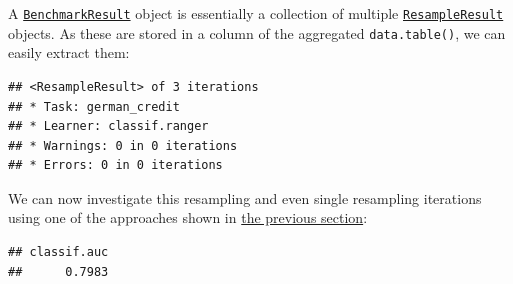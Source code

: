 \documentclass[
]{scrbook}
\newenvironment{Shaded}{\begin{snugshade}}{\end{snugshade}}
\newcommand{\CommentTok}[1]{\textcolor[rgb]{0.56,0.35,0.01}{\textit{#1}}}
\newcommand{\DecValTok}[1]{\textcolor[rgb]{0.00,0.00,0.81}{#1}}
\newcommand{\FunctionTok}[1]{\textcolor[rgb]{0.00,0.00,0.00}{#1}}
\newcommand{\NormalTok}[1]{#1}
\newcommand{\OtherTok}[1]{\textcolor[rgb]{0.56,0.35,0.01}{#1}}
\newcommand{\SpecialCharTok}[1]{\textcolor[rgb]{0.00,0.00,0.00}{#1}}
\newcommand{\StringTok}[1]{\textcolor[rgb]{0.31,0.60,0.02}{#1}}
\renewenvironment{Shaded} {\begin{snugshade}\small} {\end{snugshade}}
\begin{document}
A \href{https://mlr3.mlr-org.com/reference/BenchmarkResult.html}{\texttt{BenchmarkResult}} object is essentially a collection of multiple \href{https://mlr3.mlr-org.com/reference/ResampleResult.html}{\texttt{ResampleResult}} objects.
As these are stored in a column of the aggregated \texttt{data.table()}, we can easily extract them:

\begin{Shaded}
\end{Shaded}

\begin{verbatim}
## <ResampleResult> of 3 iterations
## * Task: german_credit
## * Learner: classif.ranger
## * Warnings: 0 in 0 iterations
## * Errors: 0 in 0 iterations
\end{verbatim}

We can now investigate this resampling and even single resampling iterations using one of the approaches shown in \protect\hyperlink{bm-exec}{the previous section}:

\begin{Shaded}
\end{Shaded}

\begin{verbatim}
## classif.auc 
##      0.7983
\end{verbatim}

\begin{Shaded}
\end{Shaded}
\end{document}
